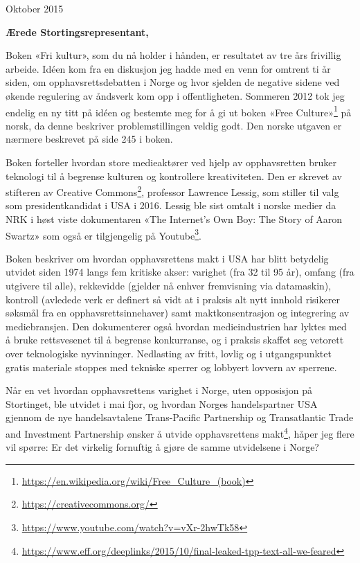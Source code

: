 \documentclass[a4paper, 11pt, norsk]{article}
\begin{document}
\begin{flushright} Oktober 2015 \end{flushright}

{\bf Ærede Stortingsrepresentant,}

Boken «Fri kultur», som du nå holder i hånden, er resultatet av tre
års frivillig arbeide.  Idéen kom fra en diskusjon jeg hadde med en
venn for omtrent ti år siden, om opphavsrettsdebatten i Norge og hvor
sjelden de negative sidene ved økende regulering av åndsverk kom opp i
offentligheten.  Sommeren 2012 tok jeg endelig en ny titt på idéen og
bestemte meg for å gi ut boken «Free
  Culture»\footnote{\url{https://en.wikipedia.org/wiki/Free_Culture_(book)}}
på norsk, da denne beskriver problemstillingen veldig godt.  Den
norske utgaven er nærmere beskrevet på side 245 i boken.

Boken forteller hvordan store medieaktører ved hjelp av opphavsretten
bruker teknologi til å begrense kulturen og kontrollere kreativiteten.
Den er skrevet av stifteren av Creative
Commons\footnote{\url{https://creativecommons.org/}}, professor
Lawrence Lessig, som stiller til valg som presidentkandidat i USA i
2016.  Lessig ble sist omtalt i norske medier da NRK i høst viste
dokumentaren «The Internet's Own Boy: The Story of Aaron Swartz» som
også er tilgjengelig på
Youtube\footnote{\url{https://www.youtube.com/watch?v=vXr-2hwTk58}}.

Boken beskriver om hvordan opphavsrettens makt i USA har blitt
betydelig utvidet siden 1974 langs fem kritiske akser: varighet (fra
32 til 95 år), omfang (fra utgivere til alle), rekkevidde (gjelder nå
enhver fremvisning via datamaskin), kontroll (avledede verk er
definert så vidt at i praksis alt nytt innhold risikerer søksmål fra
en opphavsrettsinnehaver) samt maktkonsentrasjon og integrering av
mediebransjen.  Den dokumenterer også hvordan medieindustrien har
lyktes med å bruke rettsvesenet til å begrense konkurranse, og i
praksis skaffet seg vetorett over teknologiske nyvinninger. Nedlasting
av fritt, lovlig og i utgangspunktet gratis materiale stoppes med
tekniske sperrer og lobbyert lovvern av sperrene.

Når en vet hvordan opphavsrettens varighet i Norge, uten opposisjon på
Stortinget, ble utvidet i mai fjor, og hvordan Norges handelspartner
USA gjennom de nye handelsavtalene Trans-Pacific Partnership og
Transatlantic Trade and Investment Partnership ønsker å utvide
opphavsrettens makt\footnote{\url{https://www.eff.org/deeplinks/2015/10/final-leaked-tpp-text-all-we-feared}},
håper jeg flere vil spørre: Er det virkelig fornuftig å gjøre de samme
utvidelsene i Norge?
\end{document}
